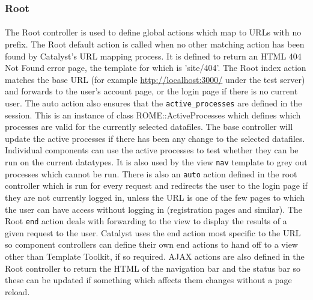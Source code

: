 \subsubsection{Root}
\label{sec:controller_root}

\paragraph{}
The Root controller is used to define global actions which map to URLs with no prefix. The Root default action is called when no other matching action has been found by Catalyst's URL mapping process. It is defined to return an HTML 404 Not Found error page, the template for which is 'site/404'. The Root index action matches the base URL (for example \url{http://localhost:3000/} under the test server) and forwards to the user's account page, or the login page if there is no current user. The auto action also ensures that the \texttt{active\_processes} are defined in the session. This is an instance of class ROME::ActiveProcesses which defines which processes are valid for the currently selected datafiles. The base controller will update the active processes if there has been any change to the selected datafiles. Individual components can use the active processes to test whether they can be run on the current datatypes. It is also used by the view \texttt{nav} template to grey out processes which cannot be run. There is also an \texttt{auto} action defined in the root controller which is run for every request and redirects the user to the login page if they are not currently logged in, unless the URL is one of the few pages to which the user can have access without logging in (registration pages and similar). The Root \texttt{end} action deals with forwarding to the view to display the results of a given request to the user. Catalyst uses the end action most specific to the URL so component controllers can define their own end actions to hand off to a view other than Template Toolkit, if so required. AJAX actions are also defined in the Root controller to return the HTML of the navigation bar and the status bar so these can be updated if something which affects them changes without a page reload.
